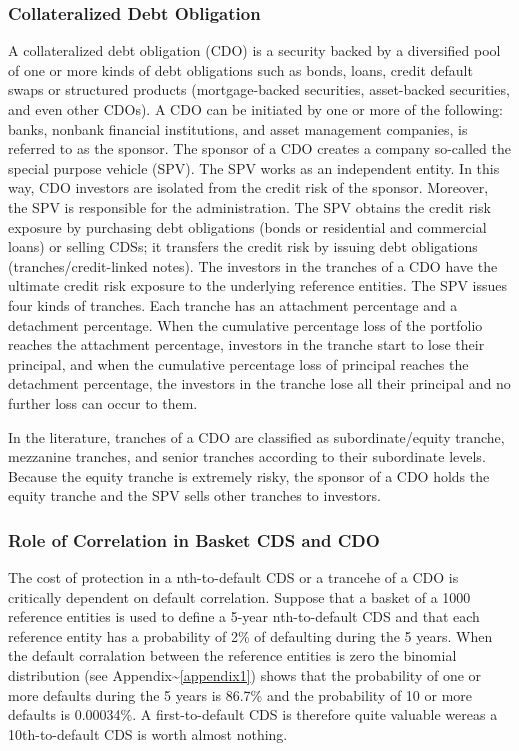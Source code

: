 \documentclass[11pt]{article}
\begin{document}
    \hypertarget{collateralized-debt-obligation}{%
\subsubsection{Collateralized Debt
Obligation}\label{collateralized-debt-obligation}}

A collateralized debt obligation (CDO) is a security backed by a
diversified pool of one or more kinds of debt obligations such as bonds,
loans, credit default swaps or structured products (mortgage-backed
securities, asset-backed securities, and even other CDOs). A CDO can be
initiated by one or more of the following: banks, nonbank financial
institutions, and asset management companies, is referred to as the
sponsor. The sponsor of a CDO creates a company so-called the special
purpose vehicle (SPV). The SPV works as an independent entity. In this
way, CDO investors are isolated from the credit risk of the sponsor.
Moreover, the SPV is responsible for the administration. The SPV obtains
the credit risk exposure by purchasing debt obligations (bonds or
residential and commercial loans) or selling CDSs; it transfers the
credit risk by issuing debt obligations (tranches/credit-linked notes).
The investors in the tranches of a CDO have the ultimate credit risk
exposure to the underlying reference entities. The SPV issues four kinds
of tranches. Each tranche has an attachment percentage and a detachment
percentage. When the cumulative percentage loss of the portfolio reaches
the attachment percentage, investors in the tranche start to lose their
principal, and when the cumulative percentage loss of principal reaches
the detachment percentage, the investors in the tranche lose all their
principal and no further loss can occur to them.

In the literature, tranches of a CDO are classified as
subordinate/equity tranche, mezzanine tranches, and senior tranches
according to their subordinate levels. Because the equity tranche is
extremely risky, the sponsor of a CDO holds the equity tranche and the
SPV sells other tranches to investors.

\hypertarget{role-of-correlation-in-basket-cds-and-cdo}{%
\subsubsection{Role of Correlation in Basket CDS and
CDO}\label{role-of-correlation-in-basket-cds-and-cdo}}

The cost of protection in a nth-to-default CDS or a trancehe of a CDO is
critically dependent on default correlation. Suppose that a basket of a
1000 reference entities is used to define a 5-year nth-to-default CDS
and that each reference entity has a probability of 2\% of defaulting
during the 5 years. When the default corralation between the reference
entities is zero the binomial distribution (see
Appendix\textasciitilde{}\ref{appendix1}) shows that the probability of
one or more defaults during the 5 years is 86.7\% and the probability of
10 or more defaults is 0.00034\%. A first-to-default CDS is therefore
quite valuable wereas a 10th-to-default CDS is worth almost nothing.
\end{document}
